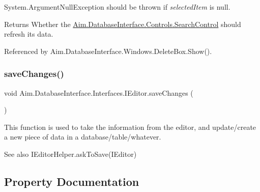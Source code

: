 System.\+Argument\+Null\+Exception should be thrown if {\itshape selected\+Item}  is null. 

\begin{DoxyReturn}{Returns}
Whether the \mbox{\hyperlink{class_aim_1_1_database_interface_1_1_controls_1_1_search_control}{Aim.\+Database\+Interface.\+Controls.\+Search\+Control}} should refresh it\textquotesingle{}s data.
\end{DoxyReturn}


Referenced by Aim.\+Database\+Interface.\+Windows.\+Delete\+Box.\+Show().

\mbox{\label{interface_aim_1_1_database_interface_1_1_interfaces_1_1_i_editor_a14261f4aef51599f166b1f2ed1e79478}} 
\subsubsection{\texorpdfstring{save\+Changes()}{saveChanges()}}
{\footnotesize\ttfamily void Aim.\+Database\+Interface.\+Interfaces.\+I\+Editor.\+save\+Changes (\begin{DoxyParamCaption}{ }\end{DoxyParamCaption})}



This function is used to take the information from the editor, and update/create a new piece of data in a database/table/whatever. 

\begin{DoxySeeAlso}{See also}
I\+Editor\+Helper.\+ask\+To\+Save(\+I\+Editor)


\end{DoxySeeAlso}


\subsection{Property Documentation}
\mbox{\label{interface_aim_1_1_database_interface_1_1_interfaces_1_1_i_editor_a6337e77ced99ce194926db76e0f0c10a}} 
